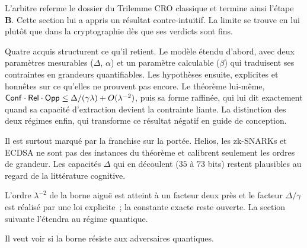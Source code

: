 \begin{boiteArbitre}
L'arbitre referme le dossier du Trilemme CRO classique et termine ainsi l'\'etape \textbf{B}. Cette section lui a
appris un r\'esultat contre-intuitif. La limite se trouve en lui plut\^ot
que dans la cryptographie d\`es que ses verdicts sont fins.

Quatre acquis structurent ce qu'il retient. Le mod\`ele \'etendu
d'abord, avec deux param\`etres mesurables ($\Delta$, $\alpha$) et un param\`etre calculable ($\beta$)
qui traduisent ses contraintes en grandeurs quantifiables. Les
hypoth\`eses ensuite, explicites et honn\^etes sur ce qu'elles ne prouvent pas
encore. Le th\'eor\`eme lui-m\^eme, $\mathsf{Conf} \cdot \mathsf{Rel} \cdot \mathsf{Opp} \leq
\Delta/(\gamma\lambda) + O(\lambda^{-2})$, puis sa forme raffin\'ee, qui lui dit
exactement quand sa capacit\'e d'extraction devient la contrainte liante. La
distinction des deux r\'egimes enfin, qui transforme ce r\'esultat n\'egatif en
guide de conception.

Il est surtout marqu\'e par la franchise sur la port\'ee. Helios, les
zk-SNARKs et ECDSA ne sont pas des instances du th\'eor\`eme et calibrent
seulement les ordres de grandeur. Les capacit\'es $\Delta$ qui en
d\'ecoulent ($35$ \`a $73$ bits) restent plausibles au regard de la
litt\'erature cognitive.

L'ordre $\lambda^{-2}$ de la borne aigu\"e est atteint \`a un facteur deux pr\`es et le
facteur $\Delta/\gamma$ est r\'ealis\'e par une loi explicite~; la constante exacte reste
ouverte. La section suivante l'\'etendra au r\'egime quantique.

Il veut voir si la borne r\'esiste aux adversaires quantiques.
\end{boiteArbitre}